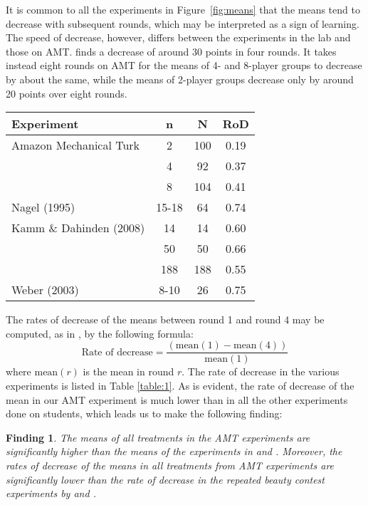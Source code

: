 \documentclass[12pt,review]{elsarticle}
\newtheorem{fdn}{Finding}
\begin{document}
It is common to all the experiments in Figure~\ref{fig:means} that the means tend to decrease with subsequent rounds, which may be interpreted as a sign of learning. The speed of decrease, however, differs between
the experiments in the lab and those on AMT. \citet{Nagel95} finds a decrease of around 30 points in four rounds. It takes instead eight rounds on AMT for the means of 4- and 8-player groups to decrease by about the same, while the means of 2-player groups decrease only by around 20 points over eight rounds.

\begin{SCtable}
\begin{tabular}{lccc}
\hline
Experiment   &  n 		&  N 	&  RoD \\
\hline
Amazon Mechanical Turk   & 2 		& 100 	& 0.19 \\
	   & 4 		& 92 	& 0.37 \\
	   & 8 		& 104 	& 0.41 \\
Nagel (1995)    & 15-18 	& 64  	& 0.74  \\
Kamm \& Dahinden (2008)  & 14 		& 14 	& 0.60  \\
	   & 50 		& 50 	& 0.66  \\
	   & 188 		& 188 	& 0.55  \\
Weber (2003)   & 8-10	& 26	& 0.75  \\
\hline
\end{tabular}
\caption{Rates of decrease in iterated p-beauty contest experiments with $p=2/3$. n = group size; N = number of subjects; RoD = rate of decrease from round 1 to round 4.}
\label{table:1}
\end{SCtable}

The rates of decrease of the means between round 1 and round 4 may be computed, as in \citet{Nagel95}, by the following formula:
\[
\text{Rate of decrease}=\frac{(\text{mean}(1)-\text{mean}(4))}{\text{mean}(1)}
\]
where $\text{mean}(r)$ is the mean in round $r$. The rate of decrease in the various experiments is listed in Table \ref{table:1}. As is evident, the rate of decrease of the mean in our AMT experiment is much lower than in all the other experiments done on students, which leads us to make the following finding:

\begin{fdn}
The means of all treatments in the AMT experiments are significantly higher than the means of the experiments in \citet{Nagel95, Kamm2008unter} and \citet{weber2003learning}. Moreover, the rates of decrease of the means in all treatments from AMT experiments are significantly lower than the rate of decrease in the repeated beauty contest experiments by \citet{Nagel95, Kamm2008unter} and \citet{weber2003learning}.
\end{fdn}
\end{document}
